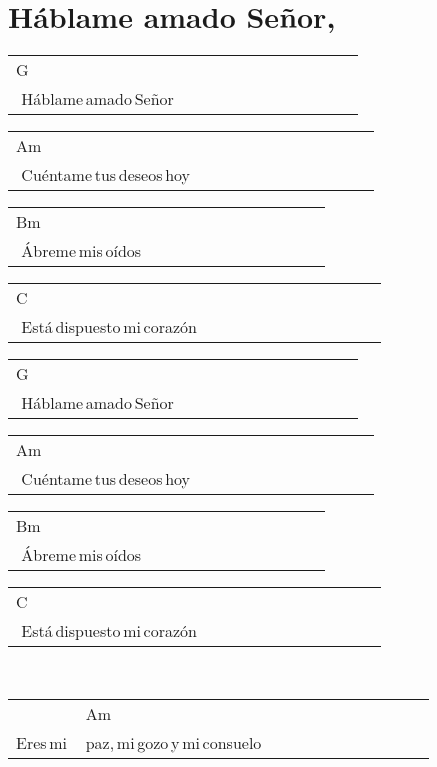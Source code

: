 \section*{Háblame amado Señor, \hfill}
\begin{multicols}{2}
\noindent
\begin{minipage}{\columnwidth}
\noindent
\noindent
\begin{tabular}{llllllllllll}
G\\
\,\,Háblame\,amado\,Señor
\end{tabular}

\noindent
\begin{tabular}{llllllllllll}
Am\\
\,\,Cuéntame\,tus\,deseos\,hoy
\end{tabular}

\noindent
\begin{tabular}{llllllllllll}
Bm\\
\,\,Ábreme\,mis\,oídos
\end{tabular}

\noindent
\begin{tabular}{llllllllllll}
C\\
\,\,Está\,dispuesto\,mi\,corazón
\end{tabular}

\noindent
\begin{tabular}{llllllllllll}
G\\
\,\,Háblame\,amado\,Señor
\end{tabular}

\noindent
\begin{tabular}{llllllllllll}
Am\\
\,\,Cuéntame\,tus\,deseos\,hoy
\end{tabular}

\noindent
\begin{tabular}{llllllllllll}
Bm\\
\,\,Ábreme\,mis\,oídos
\end{tabular}

\noindent
\begin{tabular}{llllllllllll}
C\\
\,\,Está\,dispuesto\,mi\,corazón
\end{tabular}
\end{minipage}\\

\noindent
\begin{minipage}{\columnwidth}
\noindent
\noindent
\begin{tabular}{llllllllllll}
&Am\\
Eres\,mi\,&paz,\,mi\,gozo\,y\,mi\,consuelo
\end{tabular}


\end{minipage}
\end{multicols}
